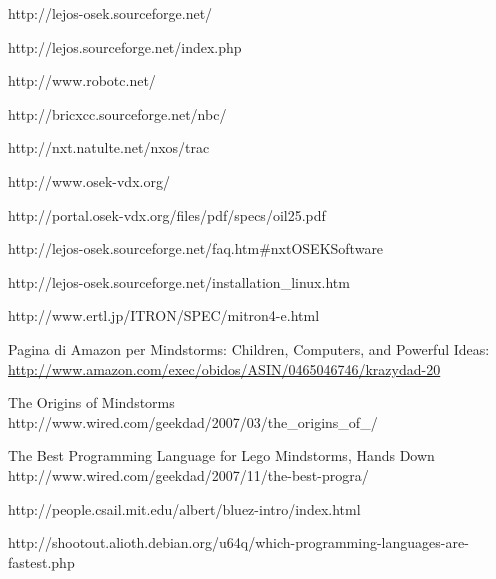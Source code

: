 \begin{thebibliography}{99}

            {http://lejos-osek.sourceforge.net/}

            {http://lejos.sourceforge.net/index.php}

            {http://www.robotc.net/}

            {http://bricxcc.sourceforge.net/nbc/}

            {http://nxt.natulte.net/nxos/trac}

            {http://www.osek-vdx.org/}

            {http://portal.osek-vdx.org/files/pdf/specs/oil25.pdf}

            {http://lejos-osek.sourceforge.net/faq.htm\#nxtOSEKSoftware}

            {http://lejos-osek.sourceforge.net/installation_linux.htm}

            {http://www.ertl.jp/ITRON/SPEC/mitron4-e.html}

    Pagina di Amazon per Mindstorms: Children, Computers, and Powerful
    Ideas: \\
    \url{http://www.amazon.com/exec/obidos/ASIN/0465046746/krazydad-20}

          {The Origins of Mindstorms}
          {http://www.wired.com/geekdad/2007/03/the_origins_of_/}

          {The Best Programming Language for Lego Mindstorms, Hands Down}
          {http://www.wired.com/geekdad/2007/11/the-best-progra/}

        {http://people.csail.mit.edu/albert/bluez-intro/index.html}

        {http://shootout.alioth.debian.org/u64q/which-programming-languages-are-fastest.php}
        
\end{thebibliography}
